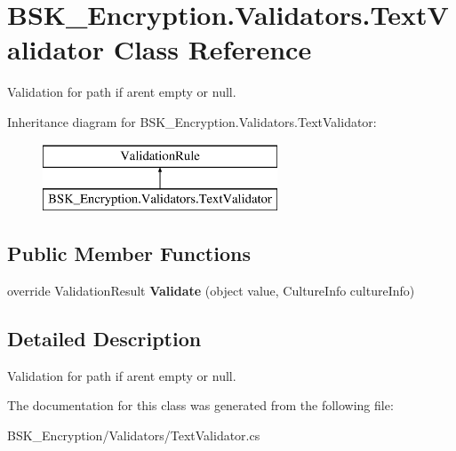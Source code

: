 \hypertarget{class_b_s_k___encryption_1_1_validators_1_1_text_validator}{}\section{B\+S\+K\+\_\+\+Encryption.\+Validators.\+Text\+Validator Class Reference}
\label{class_b_s_k___encryption_1_1_validators_1_1_text_validator}


Validation for path if aren\textquotesingle{}t empty or null.  


Inheritance diagram for B\+S\+K\+\_\+\+Encryption.\+Validators.\+Text\+Validator\+:\begin{figure}[H]
\begin{center}
\leavevmode
\includegraphics[height=2.000000cm]{class_b_s_k___encryption_1_1_validators_1_1_text_validator}
\end{center}
\end{figure}
\subsection*{Public Member Functions}
\begin{DoxyCompactItemize}
\item 
\mbox{\label{class_b_s_k___encryption_1_1_validators_1_1_text_validator_a315e01771c92cefc430ca65a53f8b148}} 
override Validation\+Result {\bfseries Validate} (object value, Culture\+Info culture\+Info)
\end{DoxyCompactItemize}


\subsection{Detailed Description}
Validation for path if aren\textquotesingle{}t empty or null. 



The documentation for this class was generated from the following file\+:\begin{DoxyCompactItemize}
\item 
B\+S\+K\+\_\+\+Encryption/\+Validators/Text\+Validator.\+cs\end{DoxyCompactItemize}
